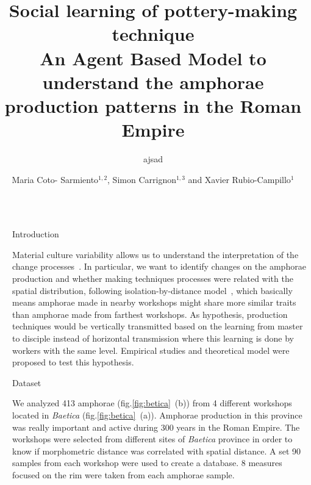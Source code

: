 \documentclass[final]{beamer}
\title{Social learning of pottery-making technique\\{\huge An Agent Based Model to understand the amphorae production patterns in the Roman Empire}}
\subtitle{ajsad}
\author{Maria Coto- Sarmiento$^{1,2}$, Simon Carrignon$^{1,3}$ and Xavier Rubio-Campillo$^{1}$} %
\institute{$^1$Barcelona Supercomputing Center -- $^2$University of Barcelona -- $^3$Universitat Pompeu Fabra} %
\newlength{\sepwid}
\newlength{\onecolwid}
\begin{document}

\setlength{\belowcaptionskip}{2ex} %
\setlength\belowdisplayshortskip{2ex} %

\begin{frame}[t] %

\begin{columns}[t] %

\begin{column}{\sepwid}\end{column} %

\begin{column}{\onecolwid} %


\begin{block}{Introduction}

\justify

Material culture variability allows us to understand the interpretation of the change processes~\cite{lycett}. In particular, we want to identify changes on the amphorae production and whether making techniques processes were related with the spatial distribution, following isolation-by-distance model~\cite{bjo}, which basically means amphorae made in nearby workshops might share more similar traits than amphorae made from farthest workshops. As hypothesis, production techniques would be vertically transmitted based on the learning from master to disciple instead of horizontal transmission where this learning is done by workers with the same level. Empirical studies and theoretical model were proposed to test this hypothesis.
 
  
\end{block}


\begin{block}{Dataset}

\justify
We analyzed 413 amphorae (fig.\ref{fig:betica}~(b)) from 4 different workshops located in \emph{Baetica} (fig.\ref{fig:betica}~(a)). Amphorae production in this province was really important and active during 300 years in the Roman Empire. The workshops were selected from different sites of \emph{Baetica} province in order to know if morphometric distance was correlated with spatial distance. A set 90 samples from each workshop were used to create a database. 8 measures focused on the rim were taken from each amphorae sample. 


\end{block}
\end{column}
\end{columns}
\end{frame}
\end{document}
